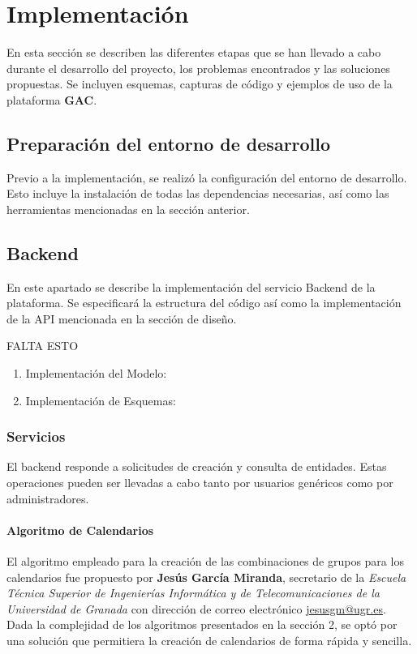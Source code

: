 \chapter{Implementación}

En esta sección se describen las diferentes etapas que se han llevado a cabo durante el desarrollo del proyecto, los problemas encontrados y las soluciones propuestas. Se incluyen esquemas, capturas de código y ejemplos de uso de la plataforma \textbf{GAC}.\newpage

\section{Preparación del entorno de desarrollo}

Previo a la implementación, se realizó la configuración del entorno de desarrollo. Esto incluye la instalación de todas las dependencias necesarias, así como las herramientas mencionadas en la sección anterior.\newline

\section{Backend}
En este apartado se describe la implementación del servicio Backend de la plataforma. Se especificará la estructura del código así como la implementación de la API mencionada en la sección de diseño.\newline

FALTA ESTO
\begin{enumerate}
    \item Implementación del Modelo:
    \item Implementación de Esquemas:
\end{enumerate}

\subsection{Servicios}

El backend responde a solicitudes de creación y consulta de entidades. Estas operaciones pueden ser llevadas a cabo tanto por usuarios genéricos como por administradores.

\subsubsection*{Algoritmo de Calendarios}

El algoritmo empleado para la creación de las combinaciones de grupos para los calendarios fue propuesto por \textbf{Jesús García Miranda}, secretario de la \textit{Escuela Técnica Superior de Ingenierías Informática y de Telecomunicaciones de la Universidad de Granada} con dirección de correo electrónico \href{mailto:jesusgm@ugr.es}{jesusgm@ugr.es}. Dada la complejidad de los algoritmos presentados en la sección 2, se optó por una solución que permitiera la creación de calendarios de forma rápida y sencilla.\newline

